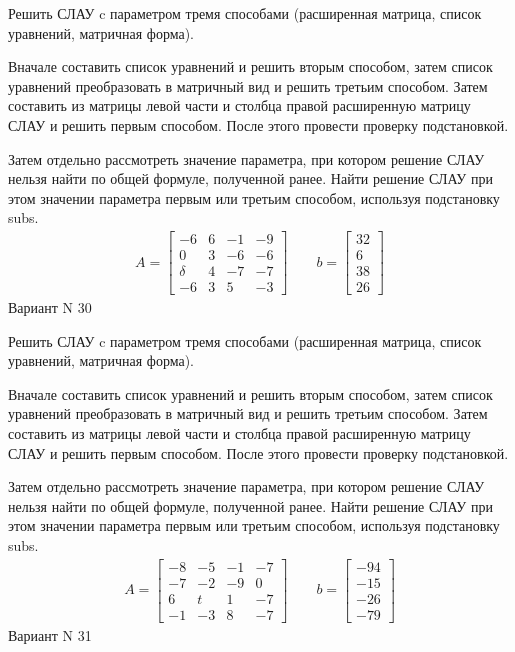 \documentclass[11pt]{report}
\begin{document}
Решить СЛАУ c параметром тремя способами (расширенная матрица, список уравнений, матричная форма).

Вначале составить список уравнений и решить вторым способом,
затем список уравнений преобразовать в матричный вид и решить третьим способом.
Затем составить из матрицы левой части и столбца правой расширенную матрицу СЛАУ и решить первым способом.
После этого провести проверку подстановкой.

Затем отдельно рассмотреть значение параметра, при котором решение СЛАУ нельзя найти по общей формуле,
полученной ранее.
Найти решение СЛАУ при этом значении параметра первым или третьим способом, используя подстановку subs.
\begin{align*}
    A = \left[\begin{matrix}-6 & 6 & -1 & -9\\0 & 3 & -6 & -6\\\delta & 4 & -7 & -7\\-6 & 3 & 5 & -3\end{matrix}\right]
\qquad b = \left[\begin{matrix}32\\6\\38\\26\end{matrix}\right]
\end{align*}
\newpage
Вариант N 30


Решить СЛАУ c параметром тремя способами (расширенная матрица, список уравнений, матричная форма).

Вначале составить список уравнений и решить вторым способом,
затем список уравнений преобразовать в матричный вид и решить третьим способом.
Затем составить из матрицы левой части и столбца правой расширенную матрицу СЛАУ и решить первым способом.
После этого провести проверку подстановкой.

Затем отдельно рассмотреть значение параметра, при котором решение СЛАУ нельзя найти по общей формуле,
полученной ранее.
Найти решение СЛАУ при этом значении параметра первым или третьим способом, используя подстановку subs.
\begin{align*}
    A = \left[\begin{matrix}-8 & -5 & -1 & -7\\-7 & -2 & -9 & 0\\6 & t & 1 & -7\\-1 & -3 & 8 & -7\end{matrix}\right]
\qquad b = \left[\begin{matrix}-94\\-15\\-26\\-79\end{matrix}\right]
\end{align*}
\newpage
Вариант N 31
\end{document}
